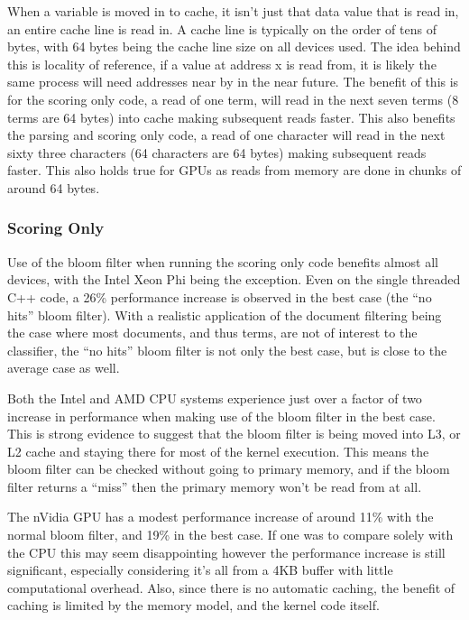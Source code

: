 When a variable is moved in to cache, it isn't just that data value that is read
in, an entire cache line is read in. A cache line is typically on the order of
tens of bytes, with 64 bytes being the cache line size on all devices used. The
idea behind this is locality of reference, if a value at address x is read from,
it is likely the same process will need addresses near by in the near future.
The benefit of this is for the scoring only code, a read of one term, will read
in the next seven terms (8 terms are 64 bytes) into cache making subsequent
reads faster. This also benefits the parsing and scoring only code, a read of
one character will read in the next sixty three characters (64 characters are 64
bytes) making subsequent reads faster. This also holds true for GPUs as reads
from memory are done in chunks of around 64 bytes.

\subsubsection{Scoring Only}

Use of the bloom filter when running the scoring only code benefits almost all
devices, with the Intel Xeon Phi being the exception. Even on the single
threaded C++ code, a 26\% performance increase is observed in the best case (the
``no hits'' bloom filter). With a realistic application of the document
filtering being the case where most documents, and thus terms, are not of
interest to the classifier, the ``no hits'' bloom filter is not only the best
case, but is close to the average case as well.

Both the Intel and AMD CPU systems experience just over a factor of two increase
in performance when making use of the bloom filter in the best case. This is
strong evidence to suggest that the bloom filter is being moved into L3, or L2
cache and staying there for most of the kernel execution. This means the bloom
filter can be checked without going to primary memory, and if the bloom filter
returns a ``miss'' then the primary memory won't be read from at all.

The nVidia GPU has a modest performance increase of around 11\% with the normal
bloom filter, and 19\% in the best case. If one was to compare solely with the
CPU this may seem disappointing however the performance increase is still
significant, especially considering it's all from a 4KB buffer with little
computational overhead. Also, since there is no automatic caching, the benefit
of caching is limited by the memory model, and the kernel code itself.

